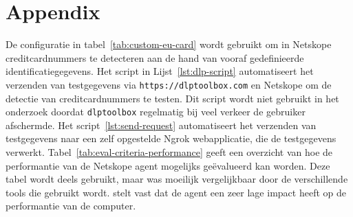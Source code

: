 
\chapter{Appendix}
\label{app:appendix}

De configuratie in tabel~\ref{tab:custom-eu-card} wordt gebruikt om in Netskope creditcardnummers te detecteren aan de hand van vooraf gedefinieerde identificatiegegevens.  
Het script in Lijst~\ref{lst:dlp-script} automatiseert het verzenden van testgegevens via \texttt{https://dlptoolbox\-.com} en Netskope om de detectie van creditcardnummers te testen. 
Dit script wordt niet gebruikt in het onderzoek doordat \texttt{dlptoolbox} regelmatig bij veel verkeer de gebruiker afschermde.
Het script~\ref{lst:send-request} automatiseert het verzenden van testgegevens naar een zelf opgestelde Ngrok webapplicatie, die de testgegevens verwerkt.
Tabel~\ref{tab:eval-criteria-performance} geeft een overzicht van hoe de performantie van de Netskope agent mogelijks geëvalueerd kan worden. 
Deze tabel wordt deels gebruikt, maar was moeilijk vergelijkbaar door de verschillende tools die gebruikt wordt.
\textcite{Netskope2025Utilization} stelt vast dat de agent een zeer lage impact heeft op de performantie van de computer.


